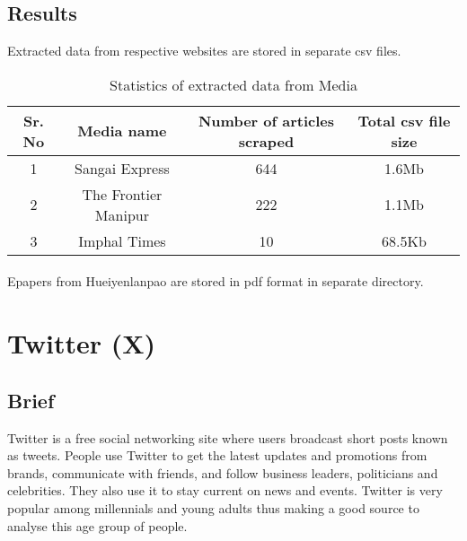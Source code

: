 \documentclass{report}
\begin{document}
\subsection{Results}
Extracted data from respective websites are stored in separate csv files. 
\begin{table}[h]
    \centering
    \setlength{\extrarowheight}{5pt}
    \begin{tabular}{|c|c|c|c|}
        \hline
        Sr. No & Media name & Number of articles scraped & Total csv file size \\
        \hline
        1 & Sangai Express & 644 & 1.6Mb \\
        \hline
        2 & The Frontier Manipur & 222 & 1.1Mb \\
        \hline
        3 & Imphal Times & 10 & 68.5Kb \\
        \hline
    \end{tabular}
    \caption{Statistics of extracted data from Media}
    \label{tab:epaper}
\end{table}
\paragraph{}Epapers from Hueiyenlanpao are stored in pdf format in separate directory.







\newpage
\vspace*{3pt}
\section{Twitter (X)}
\subsection{Brief}
Twitter is a free social networking site where users broadcast short posts known as tweets. People use Twitter to get the latest updates and promotions from brands, communicate with friends, and follow business leaders, politicians and celebrities. They also use it to stay current on news and events. Twitter is very popular among millennials and young adults thus making a good source to analyse this age group of people. 
\end{document}
